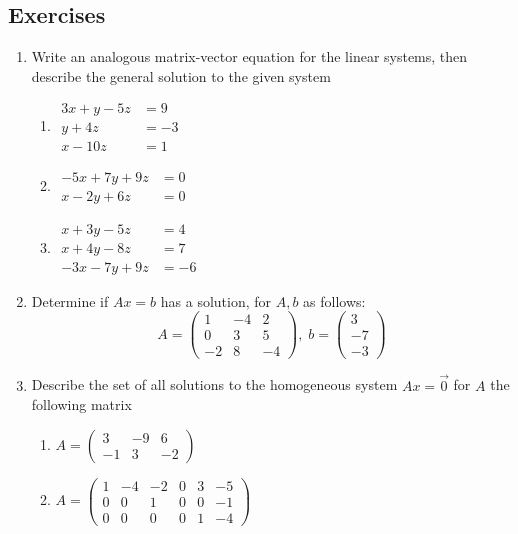 \documentclass[12pt]{article}
\numberwithin{equation}{subsection}
\numberwithin{figure}{subsection}
\theoremstyle{note}
\begin{document}
\subsection{Exercises}
\begin{enumerate}[label=\arabic*.]
	\item Write an analogous matrix-vector equation for the linear systems, then describe the general solution to the given system \begin{enumerate}
	\item $\begin{aligned} 3x+y-5z&=9 \\ y+4z&=-3 \\ x-10z&=1\end{aligned}$
	
	\item $\begin{aligned} 
		-5x+7y+9z&=0 \\ x-2y+6z&=0 
	\end{aligned}$
	\item $\begin{aligned} 
		x+3y-5z &= 4\\
	x+4y-8z &= 7\\
	-3x -7y+9z &= -6
	\end{aligned}$

	\end{enumerate}

	\item Determine if ${Ax}={b}$ has a solution, for $A,{b}$ as follows: \[ A=\begin{pmatrix} 1 & -4 & 2 \\ 0 & 3 & 5 \\ -2 & 8 & -4 \end{pmatrix}, \; {b} = \begin{pmatrix} 3\\-7\\-3 \end{pmatrix}\]

	\item Describe the set of all solutions to the homogeneous system $Ax=\vec{0}$ for $A$ the following matrix
	\begin{enumerate}
		\item $A=\begin{pmatrix} 3 & -9 & 6 \\ -1 & 3 & -2\end{pmatrix}$
		\item $A=\begin{pmatrix} 1 & -4 & -2 & 0 & 3 & -5 \\ 0 & 0 & 1 & 0 & 0 & -1 \\ 0 & 0 & 0 & 0 & 1 & -4 \end{pmatrix}$


\end{enumerate}
\end{enumerate}
\end{document}
